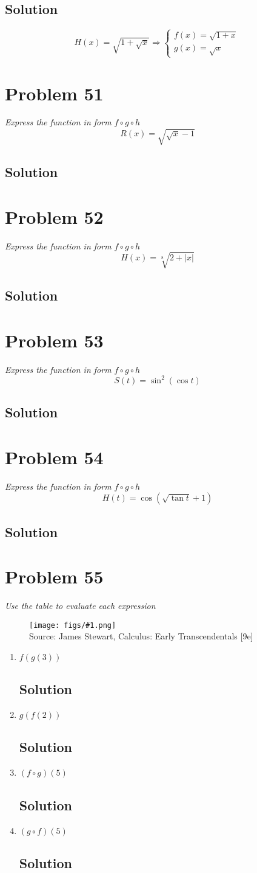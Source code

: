 \documentclass[11pt]{article}
\newcommand{\soln}{\subsection*}
\newcommand{\qn}{\textit}
\newcommand{\imagesource}[1]{{\footnotesize Source: #1}}
\newcommand{\imgqn}[1]{
	\begin{figure}[H]
		\centering
		\texttt{[image: figs/\#1.png]}\\
		\imagesource{James Stewart, Calculus: Early Transcendentals [9e]}
	\end{figure}
}
\begin{document}
\soln{Solution}
\begin{equation*}
	H(x)=\sqrt{1+\sqrt{x}}
	\Rightarrow
	\begin{cases}
		f(x) = \sqrt{1+x} \\
		g(x) = \sqrt{x}
	\end{cases}
\end{equation*}

\section*{Problem 51}

\qn{Express the function in form $f \circ g \circ h$ $$R(x)=\sqrt{\sqrt{x}-1}$$}

\soln{Solution}

\section*{Problem 52}

\qn{Express the function in form $f \circ g \circ h$ $$H(x)=\sqrt[8]{2+|x|}$$}

\soln{Solution}

\section*{Problem 53}

\qn{Express the function in form $f \circ g \circ h$ $$S(t)=\sin^2(\cos{t})$$}

\soln{Solution}

\section*{Problem 54}

\qn{Express the function in form $f \circ g \circ h$ $$H(t)=\cos(\sqrt{\tan{t}}+1)$$}

\soln{Solution}

\section*{Problem 55}

\qn{Use the table to evaluate each expression}
\imgqn{1.3.55+56}

\begin{enumerate}
	\item \qn{$f(g(3))$}
	\soln{Solution}
	
	\item \qn{$g(f(2))$}
	\soln{Solution}
	
	\item \qn{$(f \circ g)(5)$}
	\soln{Solution}
	
	\item \qn{$(g \circ f)(5)$}
	\soln{Solution}
\end{enumerate}
\end{document}
